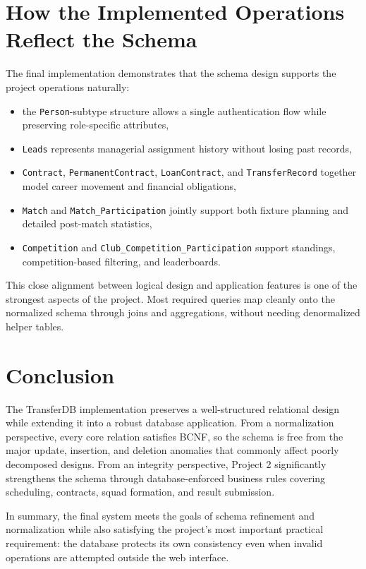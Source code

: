 \documentclass[12pt,a4paper]{article}
\begin{document}
\section{How the Implemented Operations Reflect the Schema}
The final implementation demonstrates that the schema design supports the project operations naturally:
\begin{itemize}
    \item the \texttt{Person}-subtype structure allows a single authentication flow while preserving role-specific attributes,
    \item \texttt{Leads} represents managerial assignment history without losing past records,
    \item \texttt{Contract}, \texttt{PermanentContract}, \texttt{LoanContract}, and \texttt{TransferRecord} together model career movement and financial obligations,
    \item \texttt{Match} and \texttt{Match\_Participation} jointly support both fixture planning and detailed post-match statistics,
    \item \texttt{Competition} and \texttt{Club\_Competition\_Participation} support standings, competition-based filtering, and leaderboards.
\end{itemize}

This close alignment between logical design and application features is one of the strongest aspects of the project. Most required queries map cleanly onto the normalized schema through joins and aggregations, without needing denormalized helper tables.

\section{Conclusion}
The TransferDB implementation preserves a well-structured relational design while extending it into a robust database application. From a normalization perspective, every core relation satisfies BCNF, so the schema is free from the major update, insertion, and deletion anomalies that commonly affect poorly decomposed designs. From an integrity perspective, Project 2 significantly strengthens the schema through database-enforced business rules covering scheduling, contracts, squad formation, and result submission.

In summary, the final system meets the goals of schema refinement and normalization while also satisfying the project's most important practical requirement: the database protects its own consistency even when invalid operations are attempted outside the web interface.
\end{document}
